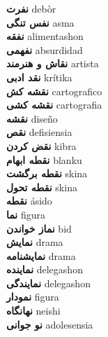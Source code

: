 \textbf{ نفرت  } debòr \\
\textbf{ نفس تنگی  } asma \\
\textbf{ نفقه  } alimentashon \\
\textbf{ نفهمی  } absurdidad \\
\textbf{ نقاش و هنرمند  } artista \\
\textbf{ نقد ادبی  } krítika \\
\textbf{ نقشه کش  } cartografico \\
\textbf{ نقشه کشی  } cartografia \\
\textbf{ نقشه  } diseño \\
\textbf{ نقص  } defisiensia \\
\textbf{ نقض کردن  } kibra \\
\textbf{ نقطه ابهام  } blanku \\
\textbf{ نقطه برگشت  } skina \\
\textbf{ نقطه تحول  } skina \\
\textbf{ نقطه  } ásido \\
\textbf{ نما  } figura \\
\textbf{ نماز خواندن  } bid \\
\textbf{ نمایش  } drama \\
\textbf{ نمایشنامه  } drama \\
\textbf{ نماینده  } delegashon \\
\textbf{ نمایندگی  } delegashon \\
\textbf{ نمودار  } figura \\
\textbf{ نهانگاه  } neishi \\
\textbf{ نو جوانی  } adolesensia \\
